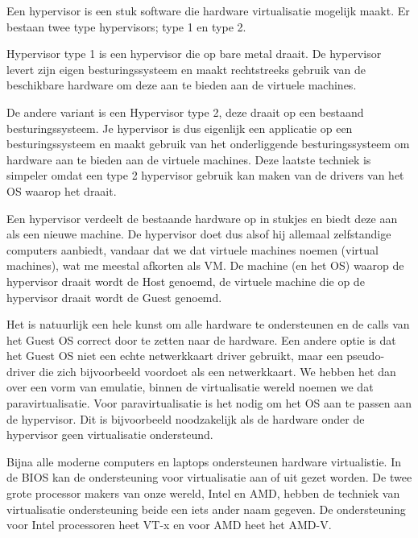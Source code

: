 Een hypervisor is een stuk software die hardware virtualisatie mogelijk maakt. Er bestaan twee type hypervisors; type 1 en type 2.

Hypervisor type 1 is een hypervisor die op bare metal draait. De hypervisor levert zijn eigen besturingssysteem en maakt rechtstreeks gebruik van de beschikbare hardware om deze aan te bieden aan de virtuele machines.

De andere variant is een Hypervisor type 2, deze draait op een bestaand besturingssysteem. Je hypervisor is dus eigenlijk een applicatie op een besturingssysteem en maakt gebruik van het onderliggende besturingssysteem om hardware aan te bieden aan de virtuele machines. Deze laatste techniek is simpeler omdat een type 2 hypervisor gebruik kan maken van de drivers van het OS waarop het draait.

Een hypervisor verdeelt de bestaande hardware op in stukjes en biedt deze aan als een nieuwe machine. De hypervisor doet dus alsof hij allemaal zelfstandige computers aanbiedt, vandaar dat we dat virtuele machines noemen (virtual machines), wat me meestal afkorten als VM. De machine (en het OS) waarop de hypervisor draait wordt de Host genoemd, de virtuele machine die op de hypervisor draait wordt de Guest genoemd.

Het is natuurlijk een hele kunst om alle hardware te ondersteunen en de calls van het Guest OS correct door te zetten naar de hardware. Een andere optie is dat het Guest OS niet een echte netwerkkaart driver gebruikt, maar een pseudo-driver die zich bijvoorbeeld voordoet als een netwerkkaart. We hebben het dan over een vorm van emulatie, binnen de virtualisatie wereld noemen we dat paravirtualisatie. Voor paravirtualisatie is het nodig om het OS aan te passen aan de hypervisor. Dit is bijvoorbeeld noodzakelijk als de hardware onder de hypervisor geen virtualisatie ondersteund.

Bijna alle moderne computers en laptops ondersteunen hardware virtualistie. In de BIOS kan de ondersteuning voor virtualisatie aan of uit gezet worden. De twee grote processor makers van onze wereld, Intel en AMD, hebben de techniek van virtualisatie ondersteuning beide een iets ander naam gegeven. De ondersteuning voor Intel processoren heet VT-x en voor AMD heet het AMD-V.
